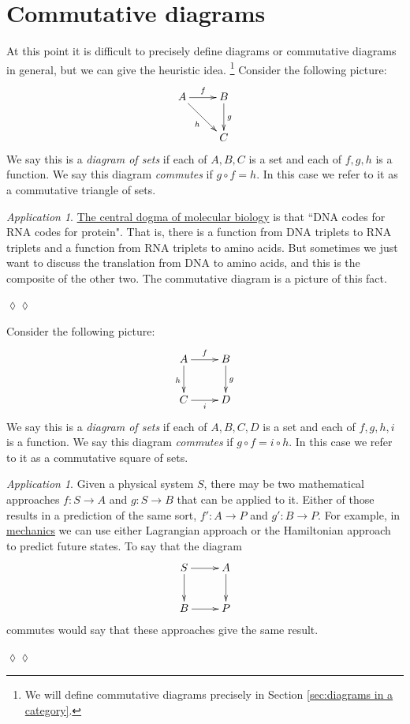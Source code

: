 \documentclass{book}
\def\to{\rightarrow}
\def\taking{\colon}
\def\Set{{\bf Set}}
\theoremstyle{remark}
\newtheorem{app}[subsubsection]{Application}
\newenvironment{application}{\begin{app}}{\hspace*{\fill}$\lozenge\lozenge$\end{app}}
\theoremstyle{definition}
\begin{document}

\section{Commutative diagrams}\label{sec:comm diag}
\addtocounter{subsection}{1}\setcounter{subsubsection}{0}

At this point it is difficult to precisely define diagrams or commutative diagrams in general, but we can give the heuristic idea.
\footnote{We will define commutative diagrams precisely in Section \ref{sec:diagrams in a category}.}
Consider the following picture: 
\begin{align}\label{dia:triangle}
\xymatrix{A\ar[r]^f\ar[rd]_h&B\ar[d]^g\\&C}
\end{align}
We say this is a {\em diagram of sets}\index{diagram!in $\Set$} if each of $A,B,C$ is a set and each of $f,g,h$ is a function. We say this diagram {\em commutes} if $g\circ f = h$. In this case we refer to it as a commutative triangle of sets.

\begin{application}

\href{http://en.wikipedia.org/wiki/Central_dogma_of_molecular_biology}{\text The central dogma of molecular biology} is that ``DNA codes for RNA codes for protein". That is, there is a function from DNA triplets to RNA triplets and a function from RNA triplets to amino acids. But sometimes we just want to discuss the translation from DNA to amino acids, and this is the composite of the other two. The commutative diagram is a picture of this fact.

\end{application}

Consider the following picture:
$$\xymatrix{A\ar[r]^f\ar[d]_h&B\ar[d]^g\\C\ar[r]_i&D}$$
We say this is a {\em diagram of sets} if each of $A,B,C,D$ is a set and each of $f,g,h,i$ is a function. We say this diagram {\em commutes} if $g\circ f=i\circ h$. In this case we refer to it as a commutative square of sets.

\begin{application}

Given a physical system $S$, there may be two mathematical approaches $f\taking S\to A$ and $g\taking S\to B$ that can be applied to it. Either of those results in a prediction of the same sort, $f'\taking A\to P$ and $g'\taking B\to P$. For example, in \href{http://en.wikipedia.org/wiki/Hamiltonian_mechanics#As_a_reformulation_of_Lagrangian_mechanics}{\text mechanics} we can use either Lagrangian approach or the Hamiltonian approach to predict future states. To say that the diagram 
$$
\xymatrix{S\ar[r]\ar[d]&A\ar[d]\\B\ar[r]&P}
$$
commutes would say that these approaches give the same result.

\end{application}
\end{document}
